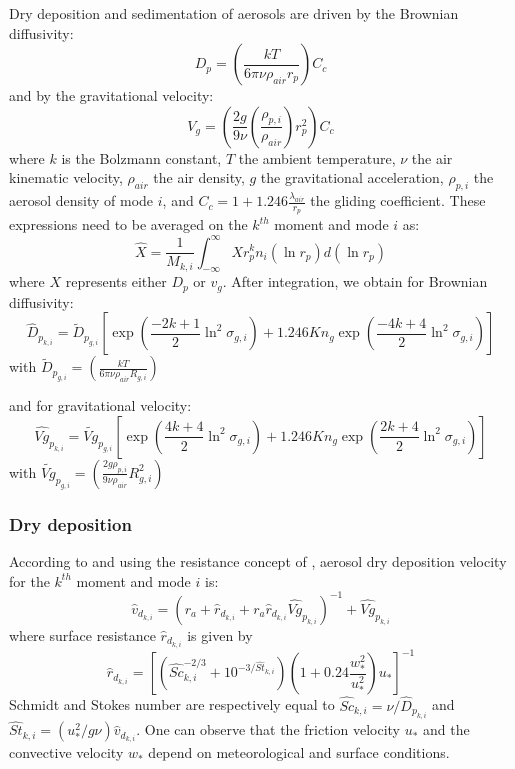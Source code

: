 Dry deposition and sedimentation of aerosols are driven by the Brownian 
diffusivity:
\begin{equation}
D_p = \left(\frac{k T}{6 \pi \nu \rho_{air} r_p} \right) C_c
\label{diff_bro}
\end{equation}
and by  the gravitational velocity:
\begin{equation}
V_g = \left(\frac{2 g}{9 \nu}\left(\frac{\rho_{p,i}}{\rho_{air}}\right) r_p^2 
\right) C_c
\label{vitesse_grav}
\end{equation}
where $k$ is the Bolzmann constant, $T$ the ambient temperature, $\nu$ the air 
kinematic velocity, $\rho_{air}$ the air density, $g$ the gravitational 
acceleration, $\rho_{p,i}$ the aerosol density of mode $i$, and $C_c = 1 + 
1.246\frac{\lambda_{air}}{r_p}$ the gliding coefficient. 
These expressions need to be averaged on the $k^{th}$ moment and mode $i$ as:
\begin{equation}
\hat{X} = \frac{1}{M_{k,i}} \int_{-\infty}^{\infty} X r^k_p n_i(\ln r_p)d(\ln r_p)
\label{moyenne}
\end{equation}
where $X$ represents either $D_p$ or $v_g$.
After integration, we obtain for  Brownian diffusivity:
\begin{equation}
\hat{D}_{p_{k,i}} = \tilde{D}_{p_{g,i}}\left[\exp\left(\frac{-2k+1}{2} 
\ln^2\sigma_{g,i} \right) + 1.246 Kn_g 
\exp \left(\frac{-4k+4}{2} \ln^2\sigma_{g,i}\right) \right]
\label{diff_brow}
\end{equation}
with $\tilde{D}_{p_{g,i}} = \left(\frac{kT}{6 \pi \nu \rho_{air} R_{g,i}} 
\right)$

and for gravitational velocity: 
\begin{equation}
\hat{Vg}_{p_{k,i}} = \tilde{Vg}_{p_{g,i}}\left[\exp\left(\frac{4k+4}{2} 
\ln^2\sigma_{g,i} \right) + 1.246 Kn_g \exp \left(\frac{2k+4}{2} 
\ln^2\sigma_{g,i}\right) \right]
\end{equation}
with $\tilde{Vg}_{p_{g,i}} = \left(\frac{2g \rho_{p,i}}{9 \nu \rho_{air}} 
R_{g,i}^2 \right)$

\subsubsection*{Dry deposition}
According to \citet{Seinfeld1997} and using the resistance concept of 
\citet{Wesely1989}, aerosol dry deposition
velocity for the $k^{th}$ moment and mode $i$ is:
\begin{equation}
\hat{v}_{d_{k,i}} = ( r_a + \hat{r}_{d_{k,i}} + r_a  \hat{r}_{d_{k,i}} 
\hat{Vg}_{p_{k,i}})^{-1} + \hat{Vg}_{p_{k,i}}
\end{equation}
where surface resistance $\hat{r}_{d_{k,i}}$ is given by
\begin{equation}
\hat{r}_{d_{k,i}} = \left[(\hat{Sc}_{k,i}^{-2/3} + 10^{-3/\hat{St}_{k,i}}) 
\left(1+ 0.24 \frac{w_*^2}{u_*^2} \right) u_* \right]^{-1}
\label{surfres}
\end{equation}
Schmidt and Stokes number are respectively equal to $\hat{Sc}_{k,i} = \nu / 
\hat{D}_{p_{k,i}}$ and
$\hat{St}_{k,i}= (u_*^2/g\nu)\hat{v}_{d_{k,i}}$.
One can observe that the friction velocity $u_*$ and the convective velocity 
$w_*$ depend on meteorological
and surface conditions. 


